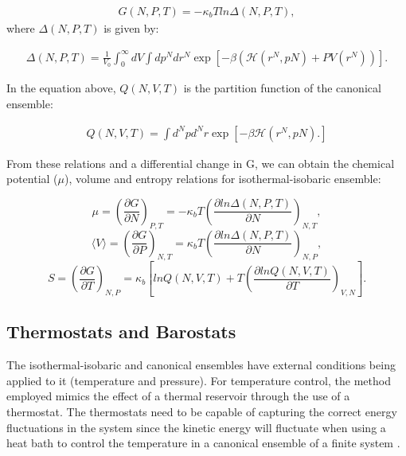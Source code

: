 \begin{equation}
\label{eq:fisobari}
\begin{aligned}
G(N,P,T) = -\kappa_{b}T ln \Delta (N,P,T),
\end{aligned}
\end{equation}
where $\Delta (N,P,T)$ is given by: 

\begin{equation}
\begin{aligned}
\Delta (N,P,T) = \frac{1}{V_{0}} \int_{0}^{\infty} dV \int d p^{N} d r^{N} \exp \left[ -\beta \left( \mathcal{H} (r^{N},p{N}) + PV(r^{N}) \right) \right] .
\end{aligned}
\end{equation}

In the equation above, $Q (N,V,T)$ is the partition function of the canonical ensemble:

\begin{equation}
\begin{aligned}
Q(N,V,T) = \int d^{N}p d^{N}r \exp \left[ -\beta \mathcal{H} (r^{N},p{N}) .
\right]
\end{aligned}
\end{equation}

From these relations and a differential change in G, we can obtain the chemical potential ($\mu$), volume and entropy relations for isothermal-isobaric ensemble:

\begin{equation}
\mu = \left (\frac{\partial G}{\partial N} \right)_{P,T} = - \kappa_{b} T \left(\frac{\partial ln \Delta (N,P,T)}{\partial N} \right)_{N,T},
\end{equation}  
\begin{equation}
\langle V \rangle= \left (\frac{\partial G}{\partial P} \right)_{N,T}= \kappa_{b} T \left (\frac{\partial ln \Delta (N,P,T)}{\partial N} \right)_{N,P},
\end{equation}
\begin{equation}
S = \left (\frac{\partial G}{\partial T} \right)_{N,P}= \kappa_{b}  \left[ln Q(N,V,T)+ T \left (\frac{\partial ln Q (N,V,T)}{\partial T} \right)_{V,N}\right] .
\end{equation}

\subsection{Thermostats and Barostats}

The isothermal-isobaric and canonical ensembles have external conditions being applied to it (temperature and pressure). For temperature control, the method employed mimics the effect of a thermal reservoir through the use of a thermostat. The thermostats need to be capable of capturing the correct energy fluctuations in the system since the kinetic energy will fluctuate when using a heat bath to control the temperature in a canonical ensemble of a finite system \cite{frenkel}.  

